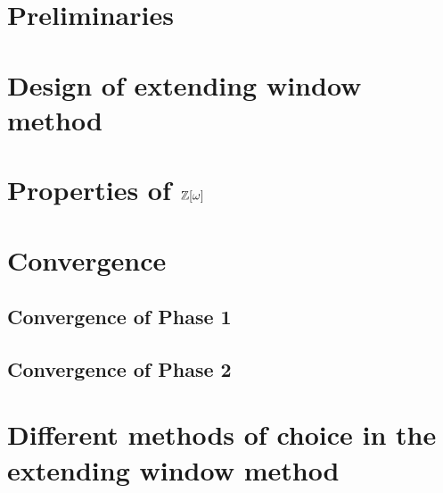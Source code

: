 \documentclass[11pt,a4paper]{report}	%
\theoremstyle{definition}
\begin{document}
\tableofcontents



\chapter{Preliminaries}
	




\chapter{Design of extending window method}
	

\chapter{\texorpdfstring{Properties of $\mathbb{Z}[\omega]$}{Properties of Z[omega]}}
	
	
		
	
\chapter{Convergence}
\label{chap:convergence}

	\section{Convergence of Phase 1}
	

	\section{Convergence of Phase 2}
	
	

	


\chapter{Different methods of choice in the extending window method}
	\label{chap:diffChoices}

	

	
\end{document}
